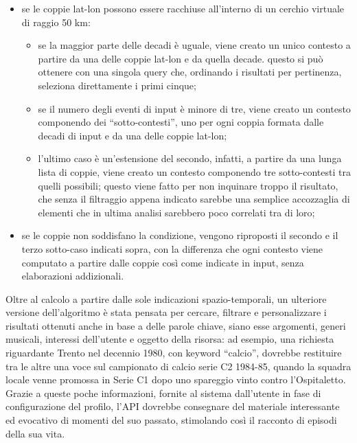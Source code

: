 \documentclass[sigproc-sp.tex]{subfiles}
\begin{document}
\begin{itemize}
\item se le coppie lat-lon possono essere racchiuse all’interno di un cerchio virtuale di raggio 50 km:
\begin{itemize}
\item se la maggior parte delle decadi è uguale, viene creato un unico contesto a partire da una delle coppie lat-lon e da quella decade. questo si può ottenere con una singola query che, ordinando i risultati per pertinenza, seleziona direttamente i primi cinque;
\item se il numero degli eventi di input è minore di tre, viene creato un contesto componendo dei “sotto-contesti”, uno per ogni coppia formata dalle decadi di input e da una delle coppie lat-lon;
\item l’ultimo caso è un’estensione del secondo, infatti, a partire da una lunga lista di coppie, viene creato un contesto componendo tre sotto-contesti tra quelli possibili; questo viene fatto per non inquinare troppo il risultato, che senza il filtraggio appena indicato sarebbe una semplice accozzaglia di elementi che in ultima analisi sarebbero poco correlati tra di loro;
\end{itemize}
\item se le coppie non soddisfano la condizione, vengono riproposti il secondo e il terzo sotto-caso indicati sopra, con la differenza che ogni contesto viene computato a partire dalle coppie così come indicate in input, senza elaborazioni addizionali.
\end{itemize}

Oltre al calcolo a partire dalle sole indicazioni spazio-temporali, un ulteriore versione dell’algoritmo è stata pensata per cercare, filtrare e personalizzare i risultati ottenuti anche in base a delle parole chiave, siano esse argomenti, generi musicali, interessi dell’utente e oggetto della risorsa: ad esempio, una richiesta riguardante Trento nel decennio 1980, con keyword “calcio”, dovrebbe restituire tra le altre una voce sul campionato di calcio serie C2 1984-85, quando la squadra locale venne promossa in Serie C1 dopo uno spareggio vinto contro l'Ospitaletto.
Grazie a queste poche informazioni, fornite al sistema dall’utente in fase di configurazione del profilo, l’API dovrebbe consegnare del materiale interessante ed evocativo di momenti del suo passato, stimolando così il racconto di episodi della sua vita.
\end{document}
